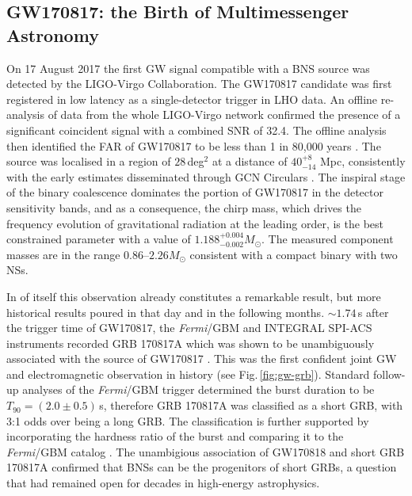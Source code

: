 \documentclass[binding=0.6cm, LaM]{sapthesis}
\begin{document}
\subsection{GW170817: the Birth of Multimessenger Astronomy}
\label{subsec:GW170817}
	On 17 August 2017 the first GW signal compatible with a BNS source 
	was detected by the LIGO-Virgo Collaboration.  
	The GW170817 candidate was first registered in low latency \cite{112,114}
	as a single-detector trigger in LHO data. 
	An offline re-analysis \cite{28,111} of data from the whole LIGO-Virgo network 
	confirmed the presence of a significant coincident signal with a combined SNR of 32.4.
	The offline analysis then identified the FAR of GW170817 to be less than 1 in 80,000 years \cite{61}. 
	The source was localised \cite{59,152} in a region of $28\,$deg$^2$ at a distance of $40^{+8}_{-14}$ Mpc, 
	consistently with the early estimates disseminated through GCN Circulars \cite{55,60}.
	The inspiral stage of the binary coalescence dominates 
	the portion of GW170817 in the detector sensitivity bands, 
	and as a consequence, the chirp mass, 
	which drives the frequency evolution of gravitational radiation at the leading order, 
	is the best constrained parameter with a value of $1.188^{+0.004}_{-0.002}M_\odot$.
	The measured component masses are in the range $0.86$--$2.26M_\odot$
	consistent with a compact binary with two NSs.

        In of itself this observation already constitutes a remarkable result, 
	but more historical results poured in that day and in the following months.  
	$\sim1.74$\,s after the trigger time of GW170817, the {\it Fermi}/GBM and INTEGRAL SPI-ACS instruments 
	recorded GRB 170817A \cite{147, 140} which was shown to be unambiguously associated 
	with the source of GW170817 \cite{55}.  
	This was the first confident joint GW and electromagnetic observation in history (see Fig.\,\ref{fig:gw-grb}).
	Standard follow-up analyses \cite{108,110} of the {\it Fermi}/GBM trigger 
	determined the burst duration to be $T_{90} = (2.0 \pm 0.5)\,$s,
	therefore GRB 170817A was classified as a short GRB, with 3:1 odds over being a long GRB.
        The classification is further supported by incorporating 
	the hardness ratio of the burst and comparing it to the {\it Fermi}/GBM catalog \cite{110}.  
	The unambigious association of GW170818 and short GRB 170817A confirmed that BNSs 
	can be the progenitors of short GRBs, a question that had remained open for decades in high-energy astrophysics.
\end{document}
